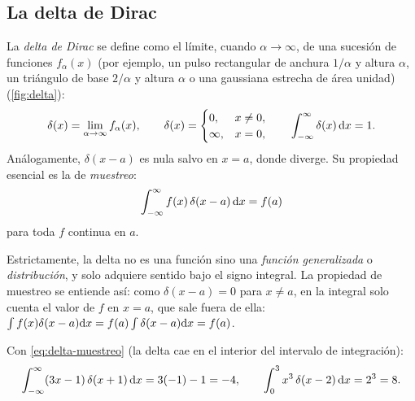 \subsection{La delta de Dirac}\label{sec:delta}
\begin{definicion}\label{def:delta}
La \emph{delta de Dirac} se define como el límite, cuando $\alpha\to\infty$, de una sucesión de funciones $f_\alpha(x)$ (por
ejemplo, un pulso rectangular de anchura $1/\alpha$ y altura $\alpha$, un triángulo de base $2/\alpha$ y altura $\alpha$ o una
gaussiana estrecha de área unidad) (\cref{fig:delta}):
\[
  \delta(x)=\lim_{\alpha\to\infty}f_\alpha(x),\qquad
  \delta(x)=\begin{cases}0,&x\neq0,\\\infty,&x=0,\end{cases}\qquad
  \int_{-\infty}^{\infty}\delta(x)\,\mathrm{d} x=1 .
\]
Análogamente, $\delta(x-a)$ es nula salvo en $x=a$, donde diverge. Su propiedad esencial es la de \emph{muestreo}:
\begin{equation}\label{eq:delta-muestreo}
  \int_{-\infty}^{\infty}f(x)\,\delta(x-a)\,\mathrm{d} x=f(a)
\end{equation}
para toda $f$ continua en $a$.
\end{definicion}



Estrictamente, la delta no es una función sino una \emph{función generalizada} o \emph{distribución}, y solo adquiere sentido
bajo el signo integral. La propiedad de muestreo se entiende así: como $\delta(x-a)=0$ para $x\neq a$, en la integral solo cuenta el
valor de $f$ en $x=a$, que sale fuera de ella: $\int f(x)\delta(x-a)\mathrm{d} x=f(a)\int\delta(x-a)\mathrm{d} x=f(a)$.

\begin{ejemplo}\label{ej:delta}
Con \cref{eq:delta-muestreo} (la delta cae en el interior del intervalo de integración):
\[
  \int_{-\infty}^{\infty}(3x-1)\,\delta(x+1)\,\mathrm{d} x=3(-1)-1=-4,\qquad
  \int_{0}^{3}x^{3}\,\delta(x-2)\,\mathrm{d} x=2^{3}=8 .
\]
\end{ejemplo}

